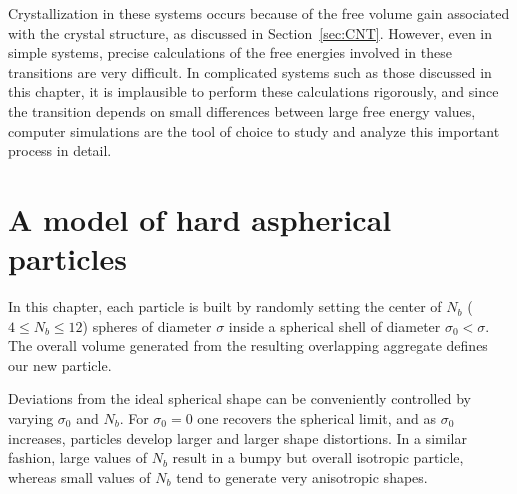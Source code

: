 Crystallization in these systems occurs because of the free volume gain associated with the crystal structure, as discussed in Section~\ref{sec:CNT}.
However, even in simple systems, precise calculations of the free energies involved in these transitions are very difficult. 
In complicated systems such as those discussed in this chapter, it is implausible to perform these calculations rigorously, and since the transition depends on small differences between large free energy values, computer simulations are the tool of choice to study and analyze this important process in detail.


\section{A model of hard aspherical particles}\label{sec:asphermethod}
In this chapter, each particle is built by randomly setting the center of $N_b$ ($4 \leq N_b \leq 12$) spheres of diameter $\sigma$ inside a spherical shell of diameter  $\sigma_0<\sigma$.
The overall volume generated from the resulting overlapping aggregate defines our new particle.

Deviations from the ideal spherical shape can be conveniently controlled by varying $\sigma_0$ and $N_b$. 
For  $\sigma_0=0$ one recovers the spherical limit, and as  $\sigma_0$ increases, particles develop larger and larger shape distortions.
In a similar fashion, large values of $N_b$ result in a bumpy but overall isotropic particle, whereas small values of $N_b$ tend to generate very anisotropic shapes.

